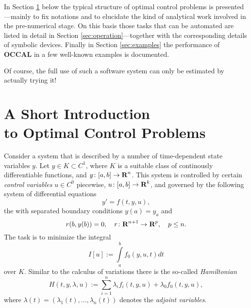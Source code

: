 \documentclass[12pt,a4paper]{article}
\newcommand{\OCCAL}{{\sf\bf OCCAL}}
\newcommand{\R}{\mbox{{\sf\bf R}}}
\begin{document}
In Section \ref{sec:intro} below the typical structure of optimal
control problems is presented\allowbreak---mainly to fix notations and to
elucidate the kind of analytical work involved in the pre-numerical
stage. On this basis those tasks that can be automated are listed in
detail in Section \ref{sec:operation}---together with the
corresponding details of symbolic devices. Finally in Section
\ref{sec:examples} the performance of \OCCAL{} in a few well-known
examples is documented.

Of course, the full use of such a software system can only be
estimated by actually trying it!


\section{A Short Introduction \protect\\ to Optimal Control Problems}

\label{sec:intro}

Consider a system that is described by a number of time-dependent
state variables $y$. Let $y\in K \subset C^{1}$, where $K$ is a
suitable class of continously differentiable functions, and $y\colon
[a,b]\rightarrow \R^{n}$.  This system is controlled by certain {\em
control variables\/} $u\in C^{0}$ piecewise, $u\colon [a,b]\rightarrow
\R^{k}$, and governed by the following system of differential
equations
\begin{equation}
  y' = f(t,y,u), \label{dyn-sys}
\end{equation}
the with separated boundary conditions $y(a)=y_{a}$ and
\begin{equation}
  r(b,y(b)) =0, \quad r\colon \R^{n+1}\rightarrow \R^{p},
   \quad  p\leq n.
\end{equation}
The task is to minimize the integral
\begin{equation}
  I[u] := \int\limits_{a}^{b} f_{0}(y,u,t) dt
\end{equation}
over $K$.
Similar to the calculus of variations there is the so-called {\em
Hamiltonian\/}
\begin{equation}
  H(t,y,\lambda,u) := \sum_{i=1}^{n} \lambda_{i} f_{i}(t,y,u)
     +\lambda_{0} f_{0}(t,y,u) \label{Hamiltonian},
\end{equation}
where $\lambda(t) = (\lambda_{1}(t),\ldots,\lambda_{n}(t))$
denotes the {\em adjoint variables}.
\end{document}
